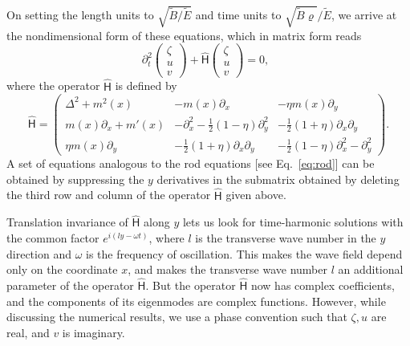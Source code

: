 On setting the length units to $\sqrt{\widetilde{B}/\widetilde{E}}$ and time units to $\sqrt{\widetilde{B}\varrho}/\widetilde{E}$, we arrive at the nondimensional form of these equations, which in matrix form reads
%
\begin{equation}
  \partial^{2}_{t}
  \begin{pmatrix}
    \zeta\\
    u\\
    v
  \end{pmatrix}
  +
  \widehat{\mathsf{H}}
  \begin{pmatrix}
    \zeta\\
    u\\
    v
  \end{pmatrix} = 0,\enspace
\end{equation}
%
where the operator $\widehat{\mathsf{H}}$ is defined by
%
\begin{equation}
  \widehat{\mathsf{H}} =
  \begin{pmatrix}
    \Delta^{2} + m^{2}(x) & -m(x)\partial_x & -\eta m(x) \partial_{y}\\
    m(x)\partial_{x} + m'(x) & -\partial_{x}^{2} - \frac{1}{2}(1-\eta)\partial^{2}_{y} & -\frac{1}{2}(1+\eta)\partial_{x}\partial_{y}\\
    \eta m(x)\partial_{y} & -\frac{1}{2}(1+\eta)\partial_{x}\partial_{y} & -\frac{1}{2}(1-\eta)\partial_{x}^{2} - \partial_{y}^{2}
  \end{pmatrix}.
  \label{eq:shell_wave_eq}
\end{equation}
%
A set of equations analogous to the rod equations [see Eq.~\eqref{eq:rod}] can be obtained by suppressing the $y$ derivatives in the submatrix obtained by deleting the third row and column of the operator $\widehat{\mathsf{H}}$ given above.

Translation invariance of $\widehat{\mathsf{H}}$ along $y$ lets us look for time-harmonic solutions with the common factor $e^{i(ly - \omega t)}$, where $l$ is the transverse wave number in the $y$ direction and $\omega$ is the frequency of oscillation.
This makes the wave field depend only on the coordinate $x$, and makes the transverse wave number $l$ an additional parameter of the operator $\widehat{\mathsf{H}}$.
But the operator $\widehat{\mathsf{H}}$ now has complex coefficients, and the components of its eigenmodes are complex functions.
However, while discussing the numerical results, we use a phase convention such that $\zeta, u$ are real, and $v$ is imaginary.

